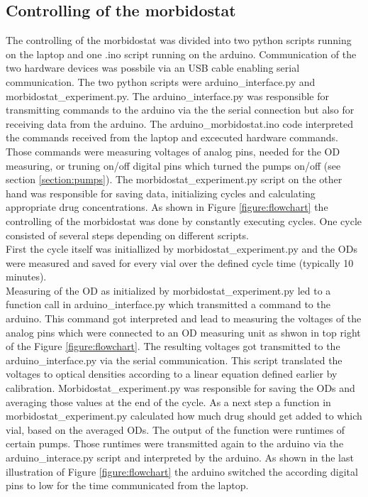 \subsection{Controlling of the morbidostat}
The controlling of the morbidostat was divided into two python scripts running on the laptop and one .ino script running on the arduino.
Communication of the two hardware devices was possbile via an USB cable enabling serial communication.
The two python scripts were arduino\_interface.py and morbidostat\_experiment.py. The arduino\_interface.py was responsible for transmitting commands to the arduino via the the serial connection but also for receiving data from the arduino. The arduino\_morbidostat.ino code interpreted the commands received from the laptop and excecuted hardware commands. Those commands were measuring voltages of analog pins, needed for the OD measuring, or truning on/off digital pins which turned the pumps on/off (see section \ref{section:pumps}).
The morbidostat\_experiment.py script on the other hand was responsible for saving data, initializing cycles and calculating appropriate drug concentrations. 
As shown in Figure \ref{figure:flowchart} the controlling of the morbidostat was done by constantly executing cycles. One cycle consisted of several steps depending on different scripts. \\
First the cycle itself was initiallized by morbidostat\_experiment.py and the ODs were measured and saved for every vial over the defined cycle time (typically 10 minutes). \\
Measuring of the OD as initialized by morbidostat\_experiment.py led to a function call in arduino\_interface.py which transmitted a command to the arduino. This command got interpreted and lead to measuring the voltages of the analog pins which were connected to an OD measuring unit as shwon in top right of the Figure \ref{figure:flowchart}. The resulting voltages got transmitted to the arduino\_interface.py via the serial communication. This script translated the voltages to optical densities according to a linear equation defined earlier by calibration. Morbidostat\_experiment.py was responsible for saving the ODs and averaging those values at the end of the cycle. As a next step a function in morbidostat\_experiment.py calculated how much drug should get added to which vial, based on the averaged ODs. The output of the function were runtimes of certain pumps. Those runtimes were transmitted again to the arduino via the arduino\_interace.py script and interpreted by the arduino. As shown in the last illustration of Figure \ref{figure:flowchart} the arduino switched the according digital pins to low for the time communicated from the laptop.
 
